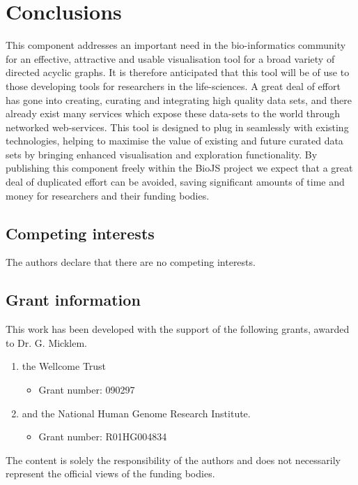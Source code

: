 \documentclass[10pt,a4paper,twocolumn]{article}
\begin{document}
\section*{Conclusions}
This component addresses an important need in the
bio-informatics community for an effective, attractive and usable visualisation
tool for a broad variety of directed acyclic graphs.  It is therefore
anticipated that this tool will be of use to those developing tools for
researchers in the life-sciences. A great deal of effort has gone into creating,
curating and integrating high quality data sets, and there already exist many
services which expose these data-sets to the world through networked
web-services. This tool is designed to plug in seamlessly with existing
technologies, helping to maximise the value of existing and future curated data
sets by bringing enhanced visualisation and exploration functionality.  By
publishing this component freely within the BioJS project we expect that a great
deal of duplicated effort can be avoided, saving significant amounts of time and
money for researchers and their funding bodies.

\subsection*{Competing interests}
The authors declare that there are no competing interests.

\subsection*{Grant information}
This work has been developed with the support of the following grants, awarded
to Dr. G. Micklem.

\begin{enumerate}
\item the Wellcome Trust
 \begin{itemize}
 \item{Grant number: 090297}
 \end{itemize}
\item and the National Human Genome Research Institute.
 \begin{itemize}
 \item{Grant number: R01HG004834}
 \end{itemize}
\end{enumerate}

The content is solely the responsibility of the authors and does not necessarily
represent the official views of the funding bodies.
\end{document}
